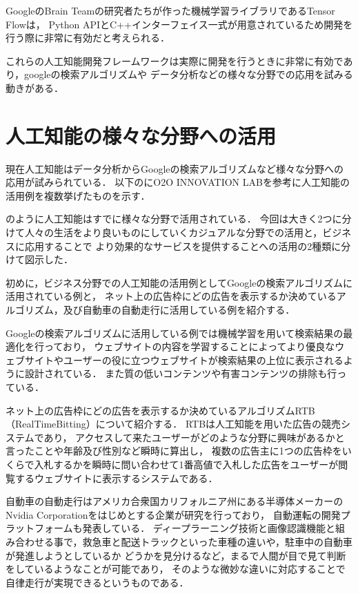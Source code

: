 GoogleのBrain Teamの研究者たちが作った機械学習ライブラリであるTensor Flowは，
Python APIとC++インターフェイス一式が用意されているため開発を行う際に非常に有効だと考えられる．

これらの人工知能開発フレームワークは実際に開発を行うときに非常に有効であり，googleの検索アルゴリズムや
データ分析などの様々な分野での応用を試みる動きがある．

\section{人工知能の様々な分野への活用}
現在人工知能はデータ分析からGoogleの検索アルゴリズムなど様々な分野への応用が試みられている．
以下のにO2O INNOVATION LAB\cite{lab}を参考に人工知能の活用例を複数挙げたものを示す．


のように人工知能はすでに様々な分野で活用されている．
今回は大きく2つに分けて人々の生活をより良いものにしていくカジュアルな分野での活用と，ビジネスに応用することで
より効果的なサービスを提供することへの活用の2種類に分けて図示した．

初めに，ビジネス分野での人工知能の活用例としてGoogleの検索アルゴリズムに活用されている例と，
ネット上の広告枠にどの広告を表示するか決めているアルゴリズム，及び自動車の自動走行に活用している例を紹介する．

Googleの検索アルゴリズムに活用している例では機械学習を用いて検索結果の最適化を行っており，
ウェブサイトの内容を学習することによってより優良なウェブサイトやユーザーの役に立つウェブサイトが検索結果の上位に表示されるように設計されている．
また質の低いコンテンツや有害コンテンツの排除も行っている．

ネット上の広告枠にどの広告を表示するか決めているアルゴリズムRTB（RealTimeBitting）について紹介する．
RTBは人工知能を用いた広告の競売システムであり，
アクセスして来たユーザーがどのような分野に興味があるかと言ったことや年齢及び性別など瞬時に算出し，
複数の広告主に1つの広告枠をいくらで入札するかを瞬時に問い合わせて1番高値で入札した広告をユーザーが閲覧するウェブサイトに表示するシステムである．

自動車の自動走行はアメリカ合衆国カリフォルニア州にある半導体メーカーのNvidia Corporationをはじめとする企業が研究を行っており，
自動運転の開発プラットフォームも発表している．
ディープラーニング技術と画像認識機能と組み合わせる事で，救急車と配送トラックといった車種の違いや，駐車中の自動車が発進しようとしているか
どうかを見分けるなど，まるで人間が目で見て判断をしているようなことが可能であり，
そのような微妙な違いに対応することで自律走行が実現できるというものである．

